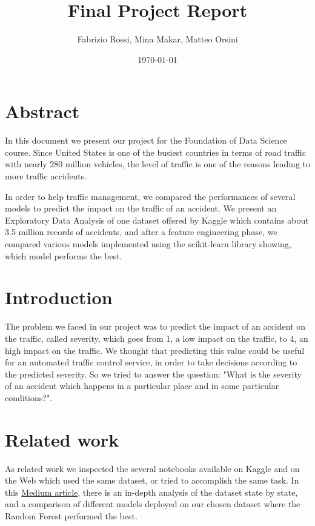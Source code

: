 \documentclass{article}
\title{Final Project Report}
\author{Fabrizio Rossi, Mina Makar, Matteo Orsini}
\date{\today}
\begin{document}
\begin{titlepage}
\clearpage\maketitle
\thispagestyle{empty}
\end{titlepage}

\section{Abstract}
In this document we present our project for the Foundation of Data Science course. Since United States is one of the busiest countries in terms of road traffic with nearly 280 million vehicles, the level of traffic is one of the reasons leading to more traffic accidents. 

In order to help traffic management, we compared the performances of several models to predict the impact on the traffic of an accident. We present an Exploratory Data Analysis of one dataset offered by Kaggle which contains about 3.5 million records of accidents, and after a feature engineering phase, we compared various models implemented using the scikit-learn library showing, which model performs the best.

\section{Introduction}
The problem we faced in our project was to predict the impact of an accident on the traffic, called severity, which goes from 1, a low impact on the traffic, to 4, an high impact on the traffic. We thought that predicting this value could be useful for an automated traffic control service, in order to take decisions according to the predicted severity. So we tried to answer the question: "What is the severity of an accident which happens in a particular place and in some particular conditions?".

\section{Related work}
As related work we inspected the several notebooks available on Kaggle and on the Web which used the same dataset, or tried to accomplish the same task. In this \href{https://ronghui-zhou.medium.com/how-you-can-avoid-car-accident-in-2020-c9626c9b6f68}{Medium article}, there is an in-depth analysis of the dataset state by state, and a comparison of different models deployed on our chosen dataset where the Random Forest performed the best.
\end{document}
